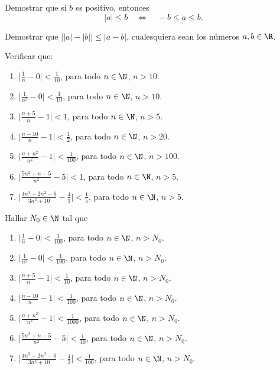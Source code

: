     \item* Demostrar que si $b$ es positivo, entonces
    \[
        |a| \le b \quad\iff\quad -b \le a \le b.
    \]

    \item\label{ej:triangular resta} Demostrar que $\big| |a|-|b| \big| \le |a-b|$, cualesquiera sean los números $a,b\in\R$.



    \item Verificar que:
    \begin{enumerate}
        \item $\Big|\frac1n - 0\Big| < \frac1{10}$, para todo $n\in\N$, $n > 10$.
        \item $\Big|\frac1{n^2} - 0\Big| < \frac1{10}$, para todo $n\in\N$, $n > 10$.
        \item $\Big|\frac{n + 5}n-1 \Big|< 1$, para todo $n\in\N$, $n > 5$.
        \item $\Big|\frac{n - 10}n-1\Big| < \frac12$, para todo $n\in\N$, $n > 20$.
        \item $\Big|\frac{n+n^2}{n^2} - 1\Big| < \frac1{100}$, para todo $n\in\N$, $n > 100$.
        \item $\Big| \frac{5n^2 + n - 5}{n^2}-5\Big| < 1 $, para todo $n\in\N$, $n > 5$.
        \item $\Big| \frac{4n^3+2n^2-6}{3n^3+10} - \frac43\Big|  < \frac1{5}$, para todo $n\in\N$, $n > 5$.
    \end{enumerate}


    \item Hallar $N_0\in\N$ tal que
        \begin{enumerate}
            \item $\Big|\frac1n - 0\Big| < \frac1{100}$, para todo $n\in\N$, $n > N_0$.
            \item $\Big|\frac1{n^2} - 0\Big| < \frac1{100}$, para todo $n\in\N$, $n > N_0$.
            \item $\Big|\frac{n + 5}n-1 \Big|< \frac1{10}$, para todo $n\in\N$, $n > N_0$.
            \item $\Big|\frac{n - 10}n-1\Big| < \frac1{100}$, para todo $n\in\N$, $n > N_0$.
            \item $\Big|\frac{n+n^2}{n^2} - 1\Big| < \frac1{1000}$, para todo $n\in\N$, $n > N_0$.
            \item $\Big| \frac{5n^2 + n - 5}{n^2}-5\Big| < \frac1{10} $, para todo $n\in\N$, $n > N_0$.
            \item $\Big| \frac{4n^3+2n^2-6}{3n^3+10} - \frac43\Big|  < \frac1{100}$, para todo $n\in\N$, $n > N_0$.
        \end{enumerate}

